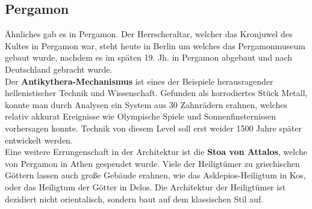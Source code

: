 \documentclass{article}
\begin{document}
	\subsection{Pergamon}
	Ähnliches gab es in Pergamon. Der Herrscheraltar, welcher das Kronjuwel des Kultes in Pergamon war, steht heute in Berlin um welches das Pergamonmuseum gebaut wurde, nachdem es im späten 19. Jh. in Pergamon abgebaut und nach Deutschland gebracht wurde. \\
	Der \textbf{Antikythera-Mechanismus} ist eines der Beispiele herausragender hellenistischer Technik und Wissenschaft. Gefunden als korrodiertes Stück Metall, konnte man durch Analysen ein System aus 30 Zahnrädern erahnen, welches relativ akkurat Ereignisse wie Olympische Spiele und Sonnenfinsternissen vorhersagen konnte. Technik von diesem Level soll erst weider 1500 Jahre später entwickelt werden. \\
	Eine weitere Errungenschaft in der Architektur ist die \textbf{Stoa von Attalos}, welche von Pergamon in Athen gespendet wurde. Viele der Heiligtümer zu griechischen Göttern lassen auch große Gebäude erahnen, wie das Asklepios-Heiligtum in Kos, oder das Heiligtum der Götter in Delos. Die Architektur der Heiligtümer ist dezidiert nicht orientalisch, sondern baut auf dem klassischen Stil auf.\\
\end{document}
